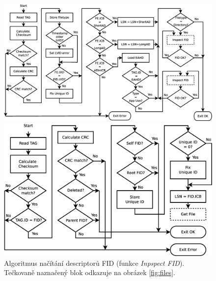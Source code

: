 \begin{figure}[!b] 
    \centering
    \includegraphics[scale=0.36]{obrazky/get-file.eps}
    \caption{Algoritmus načítání descriptorů FE (funkce \textit{Get File}). Tečkovaně naznačený blok odkazuje na obrázek \ref{fig:fid}.}
    \label{fig:files}
    \includegraphics[scale=0.36]{obrazky/inspect-fid.eps}
    \caption{Algoritmus načítání descriptorů FID (funkce \textit{Inpspect FID}). Tečkovaně naznačený blok odkazuje na obrázek \ref{fig:files}.}
    \label{fig:fid}
\end{figure}

